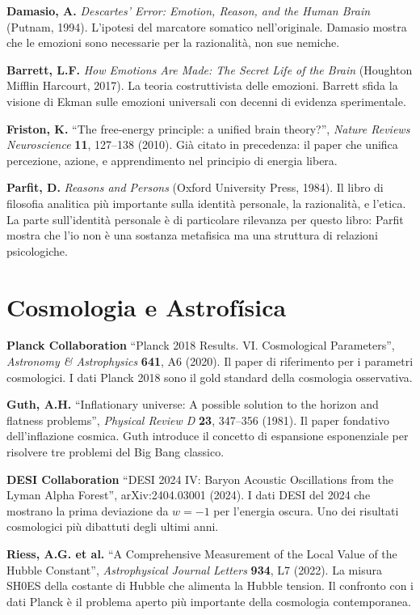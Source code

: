 \documentclass[11.5pt,a4paper,openany]{book}
\theoremstyle{remark}
\begin{document}
\textbf{Damasio, A.} \textit{Descartes' Error: Emotion, Reason, and the Human Brain} (Putnam, 1994). L'ipotesi del marcatore somatico nell'originale. Damasio mostra che le emozioni sono necessarie per la razionalità, non sue nemiche.

\textbf{Barrett, L.F.} \textit{How Emotions Are Made: The Secret Life of the Brain} (Houghton Mifflin Harcourt, 2017). La teoria costruttivista delle emozioni. Barrett sfida la visione di Ekman sulle emozioni universali con decenni di evidenza sperimentale.

\textbf{Friston, K.} ``The free-energy principle: a unified brain theory?'', \textit{Nature Reviews Neuroscience} \textbf{11}, 127--138 (2010). Già citato in precedenza: il paper che unifica percezione, azione, e apprendimento nel principio di energia libera.

\textbf{Parfit, D.} \textit{Reasons and Persons} (Oxford University Press, 1984). Il libro di filosofia analitica più importante sulla identità personale, la razionalità, e l'etica. La parte sull'identità personale è di particolare rilevanza per questo libro: Parfit mostra che l'io non è una sostanza metafisica ma una struttura di relazioni psicologiche.

\section{Cosmologia e Astrofísica}

\textbf{Planck Collaboration} ``Planck 2018 Results. VI. Cosmological Parameters'', \textit{Astronomy \& Astrophysics} \textbf{641}, A6 (2020). Il paper di riferimento per i parametri cosmologici. I dati Planck 2018 sono il gold standard della cosmologia osservativa.

\textbf{Guth, A.H.} ``Inflationary universe: A possible solution to the horizon and flatness problems'', \textit{Physical Review D} \textbf{23}, 347--356 (1981). Il paper fondativo dell'inflazione cosmica. Guth introduce il concetto di espansione esponenziale per risolvere tre problemi del Big Bang classico.

\textbf{DESI Collaboration} ``DESI 2024 IV: Baryon Acoustic Oscillations from the Lyman Alpha Forest'', arXiv:2404.03001 (2024). I dati DESI del 2024 che mostrano la prima deviazione da $w = -1$ per l'energia oscura. Uno dei risultati cosmologici più dibattuti degli ultimi anni.

\textbf{Riess, A.G. et al.} ``A Comprehensive Measurement of the Local Value of the Hubble Constant'', \textit{Astrophysical Journal Letters} \textbf{934}, L7 (2022). La misura SH0ES della costante di Hubble che alimenta la Hubble tension. Il confronto con i dati Planck è il problema aperto più importante della cosmologia contemporanea.
\end{document}

